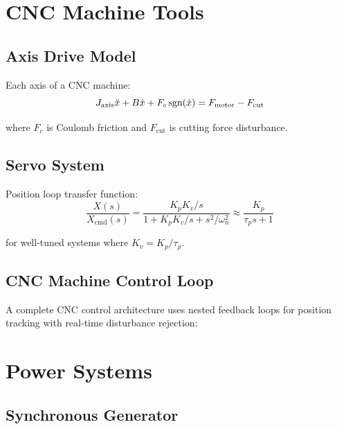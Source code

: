 \section{CNC Machine Tools}
\label{sec:cnc}

\subsection{Axis Drive Model}

Each axis of a CNC machine:
\begin{equation}
J_{\text{axis}}\ddot{x} + B\dot{x} + F_c\operatorname{sgn}(\dot{x}) = F_{\text{motor}} - F_{\text{cut}}
\end{equation}

where $F_c$ is Coulomb friction and $F_{\text{cut}}$ is cutting force disturbance.

\subsection{Servo System}

Position loop transfer function:
\begin{equation}
\frac{X(s)}{X_{\text{cmd}}(s)} = \frac{K_p K_v/s}{1 + K_p K_v/s + s^2/\omega_n^2} \approx \frac{K_p}{\tau_p s + 1}
\end{equation}

for well-tuned systems where $K_v = K_p/\tau_p$.

\subsection{CNC Machine Control Loop}

A complete CNC control architecture uses nested feedback loops for position tracking with real-time disturbance rejection:



\section{Power Systems}
\label{sec:power_systems}

\subsection{Synchronous Generator}

